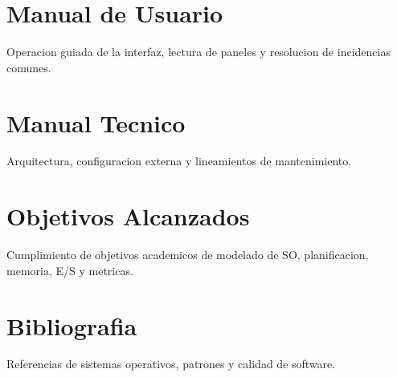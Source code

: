 \documentclass[12pt,a4paper]{article}
\begin{document}
\section{Manual de Usuario}
Operacion guiada de la interfaz, lectura de paneles y resolucion de incidencias comunes.

\section{Manual Tecnico}
Arquitectura, configuracion externa y lineamientos de mantenimiento.

\section{Objetivos Alcanzados}
Cumplimiento de objetivos academicos de modelado de SO, planificacion, memoria, E/S y metricas.

\section{Bibliografia}
Referencias de sistemas operativos, patrones y calidad de software.
\end{document}
